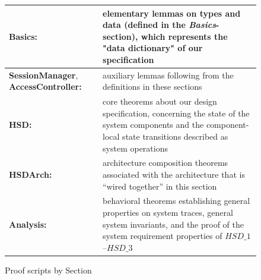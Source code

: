 \documentclass[a4paper,pdftex]{article}
\begin{document}
\begin{figure}[t]
\begin{center}
\begin{tabular}{|p{}|p{9cm}|} \hline
\textbf{Basics:} & elementary lemmas on types and data (defined in 
                  the \emph{Basics}-section), which represents the
                  "data dictionary" of our specification \\ \hline
\textbf{SessionManager}, \textbf{AccessController:}  & auxiliary lemmas following from
                   the definitions in these sections \\ \hline
\textbf{HSD:}      & core theorems about our design specification, concerning
                     the state of the system components and
                     the component-local state transitions described 
                     as system operations \\ \hline
\textbf{HSDArch:}  & architecture composition theorems associated with
                     the architecture that is ``wired together'' in this section \\ \hline
\textbf{Analysis:} & behavioral theorems establishing general properties
                     on system traces, general system invariants, and
                     the proof of the system requirement properties of
                     $HSD\_1$--$HSD\_3$ \\ \hline
\end{tabular}
\end{center}
\caption{Proof scripts by Section \label{fig:proof-sec}}
\end{figure} 
\end{document}
